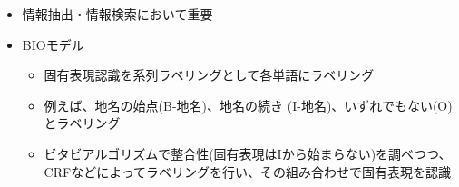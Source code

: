 \documentclass[a4j,11pt]{jsarticle}
\begin{document}
\begin{itemize}
\begin{itemize}
	      (「ローマ」は地名？サカーチーム名(組織名)？あるいは人名？)
	\item 情報抽出・情報検索において重要
	\item BIOモデル
	      \begin{itemize}
	       \item 固有表現認識を系列ラベリングとして各単語にラベリング
	       \item 例えば、地名の始点(B-地名)、地名の続き
		     (I-地名)、いずれでもない(O)とラベリング
	       \item ビタビアルゴリズムで整合性(固有表現はIから始まらない)を調べつつ、
		     CRFなどによってラベリングを行い、その組み合わせで固有表現を認識
	      \end{itemize}
       \end{itemize}
\end{itemize}
\end{document}
